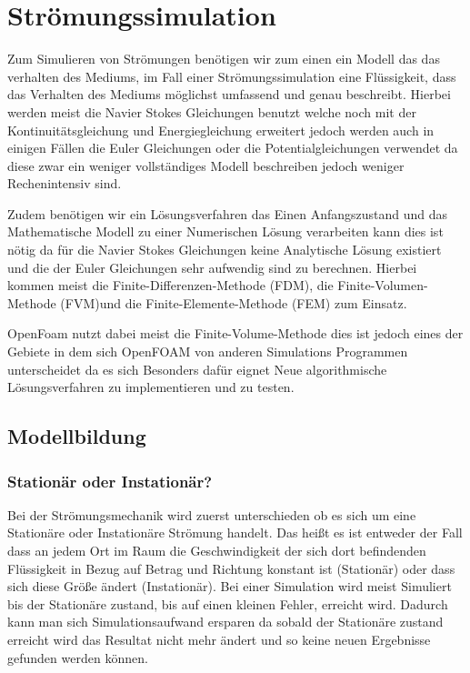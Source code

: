 %
%
%
%
\section{Strömungssimulation
\label{openfoam:section:teil1}}
Zum Simulieren von Strömungen benötigen wir zum einen ein Modell das das verhalten des Mediums, im Fall einer Strömungssimulation eine Flüssigkeit, dass das Verhalten des Mediums möglichst umfassend und genau beschreibt. Hierbei werden meist die Navier Stokes Gleichungen benutzt welche noch mit der Kontinuitätsgleichung und Energiegleichung erweitert jedoch werden auch in einigen Fällen die Euler Gleichungen oder die Potentialgleichungen verwendet da diese zwar ein weniger vollständiges Modell beschreiben jedoch weniger Rechenintensiv sind.

Zudem benötigen wir ein Lösungsverfahren das Einen Anfangszustand und das Mathematische Modell zu einer Numerischen Lösung verarbeiten kann dies ist nötig da für die Navier Stokes Gleichungen keine Analytische Lösung existiert und die der Euler Gleichungen sehr aufwendig sind zu berechnen. Hierbei kommen meist die Finite-Differenzen-Methode (FDM), die Finite-Volumen-Methode (FVM)und die Finite-Elemente-Methode (FEM) zum Einsatz. 

OpenFoam nutzt dabei meist die Finite-Volume-Methode dies ist jedoch eines der Gebiete in dem sich OpenFOAM von anderen Simulations Programmen unterscheidet da es sich Besonders dafür eignet Neue algorithmische Lösungsverfahren zu implementieren und zu testen.

\subsection{Modellbildung}
\subsubsection{Stationär oder Instationär?}
Bei der Strömungsmechanik wird zuerst unterschieden ob es sich um eine Stationäre oder Instationäre Strömung handelt. Das heißt es ist entweder der Fall dass an jedem Ort im Raum die Geschwindigkeit der sich dort befindenden Flüssigkeit in Bezug auf Betrag und Richtung konstant ist (Stationär) oder dass sich diese Größe ändert (Instationär).
Bei einer Simulation wird meist Simuliert bis der Stationäre zustand, bis auf einen kleinen Fehler, erreicht wird.
Dadurch kann man sich Simulationsaufwand ersparen da sobald der Stationäre zustand erreicht wird das Resultat nicht mehr ändert und so keine neuen Ergebnisse gefunden werden können.

